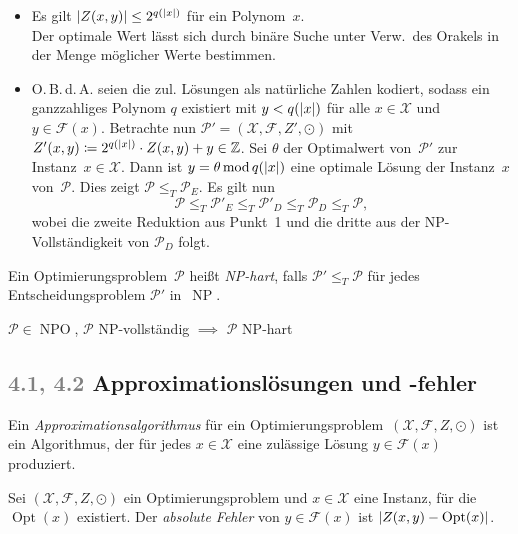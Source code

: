 \documentclass{cheat-sheet}
\newcommand{\Instances}{\mathcal{X}} %
\newcommand{\Feasible}{\mathcal{F}} %
\newcommand{\ObjFun}{Z} %
\newcommand{\Goal}{\odot} %
\newcommand{\OptTuple}{(\Instances{}, \Feasible{}, \ObjFun{}, \Goal)} %
\DeclareMathOperator{\Opt}{Opt} %
\newcommand{\size}[1]{\abs{#1}} %
\DeclareMathOperator{\NPO}{NPO} %
\DeclareMathOperator{\NP}{NP} %
\newcommand{\Prob}{\mathcal{P}} %
\newcommand{\TuringRed}{\leq_T} %
\newcommand{\scriptSection}[1]{\textcolor{gray}{#1}\enspace}
\begin{document}
\begin{beweisskizze}
  \begin{itemize}
    \item
      Es gilt $\abs{Z(x, y)} \leq 2^{q(\size{x})}$ für ein Polynom~$x$. \\
      Der optimale Wert lässt sich durch binäre Suche unter Verw.\ des Orakels in der Menge möglicher Werte bestimmen.
    \item
      O.\,B.\,d.\,A. seien die zul. Lösungen als natürliche Zahlen kodiert, sodass ein ganzzahliges Polynom $q$ existiert mit $y < q(\size{x})$ für alle $x \in \Instances{}$ und $y \in \Feasible(x)$.
      Betrachte nun $\Prob' = (\Instances{}, \Feasible{}, \ObjFun{}', \Goal{})$ mit $\ObjFun'(x, y) \coloneqq 2^{q(\size{x})} \cdot Z(x, y) + y \in \Z$.
      Sei $\theta$ der Optimalwert von~$\Prob'$ zur Instanz~$x \in \Instances$.
      Dann ist $y = \theta \,\mathrm{mod}\, q(\size{x})$ eine optimale Lösung der Instanz~$x$ von~$\Prob$.
      Dies zeigt $\Prob \TuringRed \Prob_E$.
      Es gilt nun
      \[
        \Prob \TuringRed
        \Prob'_E \TuringRed
        \Prob'_D \TuringRed
        \Prob_D \TuringRed
        \Prob,
      \]
      wobei die zweite Reduktion aus Punkt~1 und die dritte aus der NP-Vollständigkeit von $\Prob_D$ folgt.
  \end{itemize}
\end{beweisskizze}

\begin{defn}
  Ein Optimierungsproblem~$\Prob$ heißt \emph{NP-hart}, falls $\Prob' \TuringRed \Prob$ für jedes Entscheidungsproblem $\Prob'$ in~$\NP$.
\end{defn}

\begin{beob}
  $\Prob \in \NPO$, $\Prob$ NP-vollständig $\implies$ $\Prob$ NP-hart
\end{beob}

\subsection{\scriptSection{4.1, 4.2} Approximationslösungen und -fehler}

\begin{defn}
  Ein \emph{Approximationsalgorithmus} für ein Optimierungsproblem~$\OptTuple$ ist ein Algorithmus, der für jedes $x \in \Instances$ eine zulässige Lösung $y \in \Feasible(x)$ produziert.
\end{defn}

\begin{defn}
  Sei $\OptTuple$ ein Optimierungsproblem und $x \in \Instances$ eine Instanz, für die $\Opt(x)$ existiert.
  Der \emph{absolute Fehler} von $y \in \Feasible(x)$ ist $\abs{Z(x, y) - \Opt(x)}$.
\end{defn}
\end{document}
